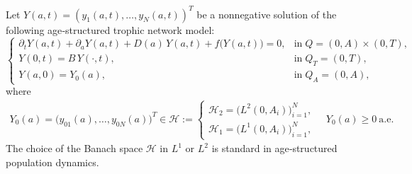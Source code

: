 \documentclass[10pt, a4paper]{amsart}
\theoremstyle{plain}
\theoremstyle{definition}
\theoremstyle{remark}
\numberwithin{equation}{section}
\begin{document}

Let \(Y(a,t) = (y_1(a,t), \dots, y_N(a,t))^T\) be a nonnegative solution of the following age‐structured trophic network model:
\begin{equation}\label{eq1.3}
\begin{cases}
\partial_t Y(a,t) + \partial_a Y(a,t) + D(a)\,Y(a,t) + f\bigl(Y(a,t)\bigr)=0,
& \text{in}\;Q=(0,A)\times(0,T),\\
Y(0,t)=B\,Y(\cdot,t),   & \text{in}\;Q_T=(0,T),\\
Y(a,0)=Y_0(a),         & \text{in}\;Q_A=(0,A),
\end{cases}
\end{equation}
where
\begin{align}\label{eq1.4}
    Y_0(a) = \bigl(y_{01}(a),\dots,y_{0N}(a)\bigr)^T
\in
\mathcal{H} :=
\begin{cases}
\mathcal{H}_2=\bigl(L^2(0,A_i)\bigr)_{i=1}^N,\\
\mathcal{H}_1=\bigl(L^1(0,A_i)\bigr)_{i=1}^N,
\end{cases}
\quad Y_0(a)\ge0\ \text{a.e.}
\end{align}
The choice of the Banach space \(\mathcal H\) in \(L^1\) or \(L^2\) is standard in age‐structured population dynamics.
\end{document}
